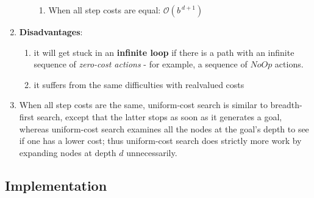 \begin{enumerate}
\begin{enumerate}
\begin{enumerate}
            \item When all step costs are equal: $\mathcal{O}(b^{\ d+1})$
            \hfill \cite{ai/book/Artificial-Intelligence-A-Modern-Approach/Russell-Norvig}
        \end{enumerate}
    \end{enumerate}

    \item \textbf{Disadvantages}:
    \begin{enumerate}
        \item it will get stuck in an \textbf{infinite loop} if there is a path with an infinite sequence of \textit{zero-cost actions} - for example, a sequence of $NoOp$ actions.
        \hfill \cite{ai/book/Artificial-Intelligence-A-Modern-Approach/Russell-Norvig}

        \item  it suffers from the same difficulties with realvalued costs
        \hfill \cite{ai/book/Artificial-Intelligence-A-Modern-Approach/Russell-Norvig}
    \end{enumerate}

    \item When all step costs are the same, uniform-cost search is similar to breadth-first search, except that the latter stops as soon as it generates a goal, whereas uniform-cost search examines all the nodes at the goal’s depth to see if one has a lower cost; thus uniform-cost search does strictly more work by expanding nodes at depth $d$ unnecessarily.
    \hfill \cite{ai/book/Artificial-Intelligence-A-Modern-Approach/Russell-Norvig}
\end{enumerate}




\subsection*{Implementation}

